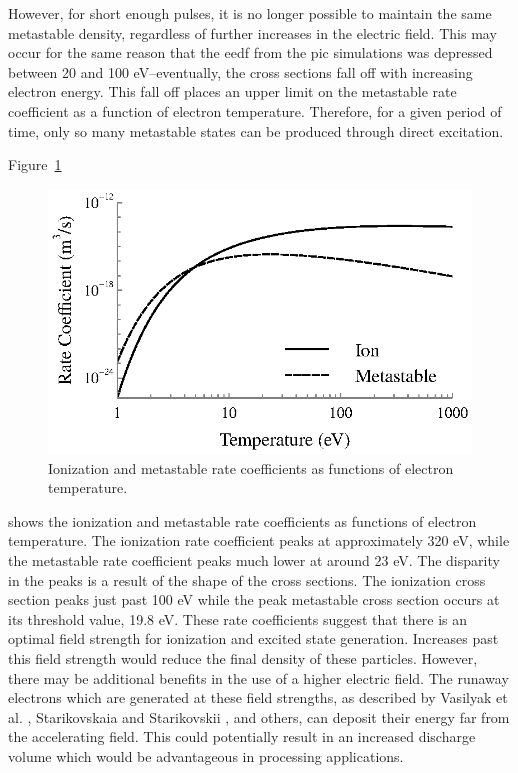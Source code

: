 However, for short enough pulses, it is no longer possible to maintain the
same metastable density, regardless of further increases in the electric field.
This may occur for the same reason that the \acs{eedf} from the \acs{pic}
simulations was depressed between 20 and 100 eV--eventually, the cross sections
fall off with increasing electron energy. This fall off places an upper limit on
the metastable rate coefficient as a function of electron temperature.
Therefore, for a given period of time, only so many metastable states can be
produced through direct excitation.

Figure~\ref{fig:longrates}
\begin{figure}
  \centering
  \includegraphics{./chapters/modeling/figures/longrates.eps}
  \caption{Ionization and metastable rate coefficients as functions of
    electron temperature.}
  \label{fig:longrates}
\end{figure}
shows the ionization and metastable rate coefficients as functions of electron
temperature. The ionization rate coefficient peaks at approximately 320 eV,
while the metastable rate coefficient peaks much lower at around 23 eV. The
disparity in the peaks is a result of the shape of the cross sections. The
ionization cross section peaks just past 100 eV while the peak metastable cross
section occurs at its threshold value, 19.8 eV. These rate coefficients suggest
that there is an optimal field strength for ionization and excited state
generation. Increases past this field strength would reduce the final density of
these particles. However, there may be additional benefits in the use of a
higher electric field. The runaway electrons which are generated at these field
strengths, as described by Vasilyak et al. \cite{Vasilyak1994}, Starikovskaia
and Starikovskii \cite{Starikovskaia2001a}, and others, can deposit their energy
far from the accelerating field. This could potentially result in an increased
discharge volume which would be advantageous in processing applications.

